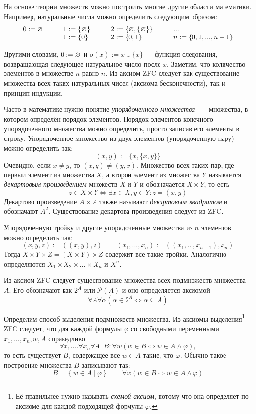 На основе теории множеств можно построить многие другие области математики.
Например, натуральные числа можно определить следующим образом:
\[ \begin{array}{llll}
	0 :=\varnothing\qquad & 1  :=\{\varnothing\}\qquad & 2  :=\{\varnothing,\{\varnothing\}\}\qquad & ... \\
	& 1:=\{0\}\qquad       & 2:=\{0,1\}
	& n:=\{0,1,...,n-1\}
\end{array}
\]

Другими словами, ${0:=\varnothing}$ и $\sigma(x):=x\cup \{x\}$ --- функция следования,
возвращающая следующее натуральное число после $x$. Заметим, что количество элементов
в множестве $n$ равно $n$. Из аксиом ZFC следует как существование множества
всех таких натуральных чисел (аксиома бесконечности), так и принцип индукции.

Часто в математике нужно понятие {\it упорядоченного множества}~---~множества,
в котором определён порядок элементов. Порядок элементов
конечного упорядоченного множества можно
определить, просто записав его элементы в строку.
Упорядоченное множество из двух элементов (упорядоченную пару)
можно определить так:
\[
	(x,y):=\{x,\{x,y\}\}
\]
Очевидно, если $x\neq y$, то $(x,y)\neq(y,x)$. Множество
всех таких пар, где первый элемент из множества $X$, а второй элемент
из множества $Y$ называется {\it декартовым произведением} множеств
$X$ и $Y$ и
обозначается $X\times Y$, то есть
\[
	z\in X\times Y\iff \exists x\in X,y\in Y:z=(x,y)
\]
Декартово произведение $A\times A$ также называют {\it декартовым квадратом}
и обозначают $A^{2}$. Существование декартова произведения следует из ZFC.

Упорядоченную тройку и другие упорядоченные множества из $n$ элементов
можно определить так:
\[
	(x,y,z):=((x,y),z)\qquad (x_1,...,x_{n}):=((x_1,...,x_{n-1}),x_{n})
\]
Тогда $X\times Y\times Z=(X\times Y)\times Z$ содержит все такие тройки.
Аналогично определяются $X_1\times X_2\times ...\times X_{n}$ и $X^{n}$.

Из аксиом ZFC следует существование множества всех подмножеств множества $A$.
Его обозначают как $2^{A}$ или $\mathcal P(A)$ и оно определяется аксиомой
\[
	\forall A\forall \alpha(\alpha\in 2^{A}\iff \alpha\subseteq A)
\]

Определим способ выделения подмножеств множества.
Из аксиомы выделения\footnote{Её правильнее нужно называть {\it схемой аксиом},
потому что она определяет по аксиоме для каждой подходящей формулы $\varphi$.}
ZFC следует, что для каждой формулы $\varphi$ со свободными
переменными $x_1,...,x_{n},w,A$  справедливо
\[
	\forall x_1....\forall x_{n}\forall A\exists B:\forall w(w\in B\iff
	w\in A\land \varphi),
\]
то есть существует $B$, содержащее все $w\in A$ такие, что $\varphi$.
Обычно такое построение множества $B$ записывают так:
\[
	B=\left\{w\in A\;\big|\;\varphi\right\}\qquad
	\forall w(w\in B\iff w\in A\land \varphi)
\]

